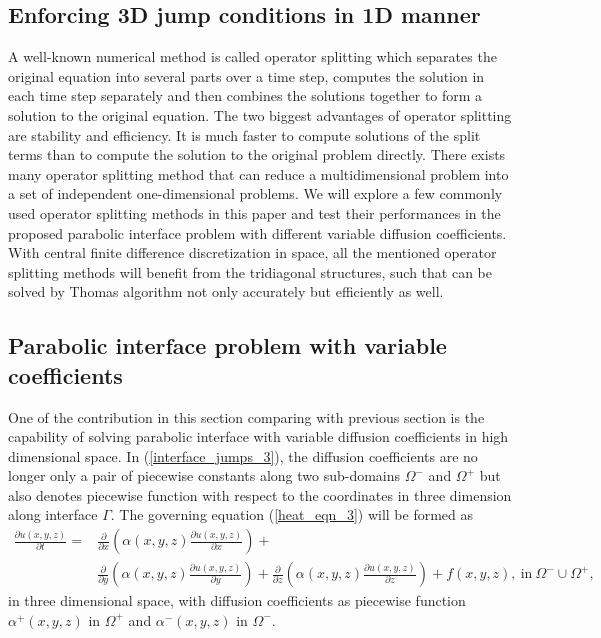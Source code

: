 \documentclass[dissertation]{uathesis}
\begin{document}
\begin{body}
\begin{flushleft}
\section{Enforcing 3D jump conditions in 1D manner}
%
\hspace{1cm} A well-known numerical method is called operator splitting which separates the original equation into several parts over a time step, computes the solution in each time step separately and then combines the solutions together to form a solution to the original equation. The two biggest advantages of operator splitting are stability and efficiency. It is much faster to compute solutions of the split terms than to compute the solution to the original problem directly. There exists many operator splitting method that can reduce a multidimensional problem into a set of independent one-dimensional problems. We will explore a few commonly used operator splitting methods in this paper and test their performances in the proposed parabolic interface problem with different variable diffusion coefficients. With central finite difference discretization in space, all the mentioned operator splitting methods will benefit from the tridiagonal structures, such that can be solved by Thomas algorithm not only accurately but efficiently as well.  
%
\subsection{Parabolic interface problem with variable coefficients}
%
\hspace{1cm} One of the contribution in this section comparing with previous section is the capability of solving parabolic interface with variable diffusion coefficients in high dimensional space. In (\ref{interface_jumps_3}), the diffusion coefficients are no longer only a pair of piecewise constants along two sub-domains $\Omega^{-}$ and $\Omega^{+}$ but also denotes piecewise function with respect to the coordinates in three dimension along interface $\Gamma$. The governing equation (\ref{heat_eqn_3}) will be formed as
%
\begin{align} \label{discretized_eqn_3}
\frac{\partial u(x, y, z)}{\partial t} = 
&\frac{\partial}{\partial x}(\alpha(x,y,z) \frac{\partial u(x, y, z)}{\partial x}) + \\
&\frac{\partial}{\partial y}(\alpha(x,y,z) \frac{\partial u(x, y, z)}{\partial y}) + 
\frac{\partial}{\partial z}(\alpha(x,y,z) \frac{\partial u(x, y, z)}{\partial z}) + f(x, y, z), 
~ \mbox{in} ~ \Omega^{-} \cup \Omega^{+}, \nonumber
\end{align}
%
in three dimensional space, with diffusion coefficients as piecewise function $\alpha^{+}(x, y, z)$ in $\Omega^{+}$ and $\alpha^{-}(x, y, z)$ in $\Omega^{-}$.
%	

\end{flushleft}
\end{body}
\end{document}
